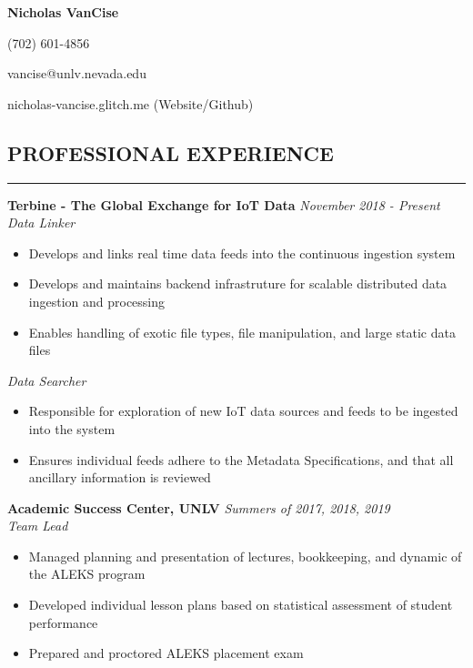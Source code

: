 \documentclass{res}
\begin{document}
	\thispagestyle{empty} %
	\centerline{\bf \Large{Nicholas VanCise}}
	\centerline{(702) 601-4856}
	\centerline{vancise@unlv.nevada.edu}
  \centerline{nicholas-vancise.glitch.me (Website/Github)}

	\begin{resume}

		\section{{PROFESSIONAL EXPERIENCE}}
    \noindent\rule[0.5ex]{\linewidth}{1pt}
		{\bf Terbine - The Global Exchange for IoT Data} \hfill \emph{November 2018 - Present} \\
			\emph{Data Linker}

			\begin{itemize} \itemsep -2pt
				\item Develops and links real time data feeds into the continuous ingestion system
				\item Develops and maintains backend infrastruture for scalable distributed data ingestion and processing
				\item Enables handling of exotic file types, file manipulation, and large static data files
			\end{itemize} \vspace{-2mm}

			\emph{Data Searcher}

			\begin{itemize} \itemsep -2pt
				\item Responsible for exploration of new IoT data sources and feeds to be ingested into the system
				\item Ensures individual feeds adhere to the Metadata Specifications, and that all ancillary information is reviewed
			\end{itemize} \vspace{-2mm}

		{\bf Academic Success Center, UNLV} \hfill \emph{Summers of 2017, 2018, 2019} \\
			\emph{Team Lead}

			\begin{itemize} \itemsep -2pt
				\item Managed planning and presentation of lectures, bookkeeping, and dynamic of the ALEKS program
				\item Developed individual lesson plans based on statistical assessment of student performance
        \item Prepared and proctored ALEKS placement exam
			\end{itemize}



\end{resume}
\end{document}
